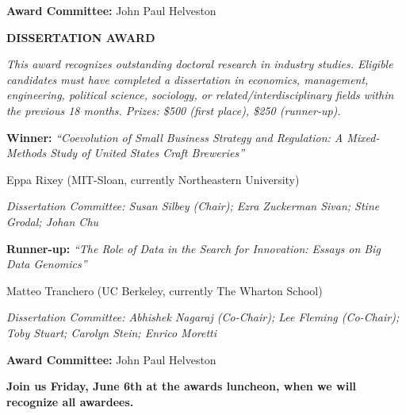 \documentclass[
  10pt,
  letterpaper,
  DIV=11,
  numbers=noendperiod]{scrartcl}
\begin{document}
{\noindent\textbf{Award Committee:} John Paul Helveston\par
\vspace{0.4em}

\noindent\textcolor{event}{\textbf{DISSERTATION AWARD}}\par\vspace{0.1em}
\noindent\textit{This award recognizes outstanding doctoral research in industry studies. Eligible candidates must have completed a dissertation in economics, management, engineering, political science, sociology, or related/interdisciplinary fields within the previous 18 months. Prizes: \$500 (first place), \$250 (runner-up).}\par\vspace{0.15em}
\noindent \textbf{Winner:} \textit{``Coevolution of Small Business Strategy and Regulation: A Mixed-Methods Study of United States Craft Breweries''}\par
\noindent Eppa Rixey (MIT-Sloan, currently Northeastern University)\par
\noindent\textit{Dissertation Committee: Susan Silbey (Chair); Ezra Zuckerman Sivan; Stine Grodal; Johan Chu}\par
\vspace{0.2em}

\noindent \textbf{Runner-up:} \textit{``The Role of Data in the Search for Innovation: Essays on Big Data Genomics''}\par
\noindent Matteo Tranchero (UC Berkeley, currently The Wharton School)\par
\noindent\textit{Dissertation Committee: Abhishek Nagaraj (Co-Chair); Lee Fleming (Co-Chair); Toby Stuart; Carolyn Stein; Enrico Moretti}\par
\vspace{0.2em}

\noindent\textbf{Award Committee:} John Paul Helveston\par
\vspace{1.5em}

\begin{center}\textbf{Join us Friday, June 6th at the awards luncheon, when we will recognize all awardees.}\end{center}
}
\newpage
\end{document}
